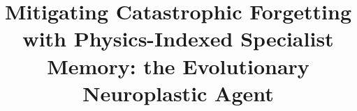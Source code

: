 \documentclass[10pt]{article}
\title{Mitigating Catastrophic Forgetting with Physics-Indexed Specialist Memory: the Evolutionary Neuroplastic Agent}
\makeatletter
\newcommand{\IfDeanonymized}[2]{\if@accepted#1\else#2\fi}
\makeatother
\begin{document}
\maketitle
\let\AND\relax

\begin{abstract}

\end{abstract}








\IfDeanonymized{}{}
\IfDeanonymized{}{}




\appendix

\end{document}
